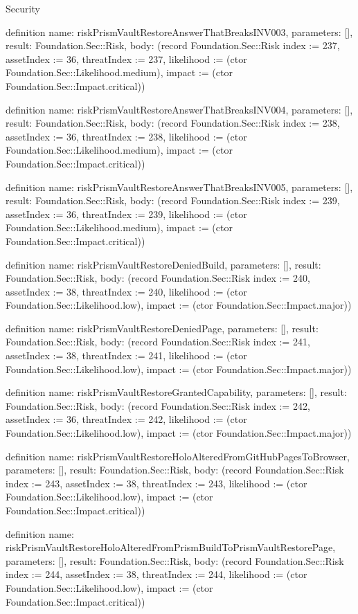 \begin{lexlean}{Security}
\begin{semanticmodule}
definition{
  name: riskPrismVaultRestoreAnswerThatBreaksINV003,
  parameters: [],
  result: Foundation.Sec::Risk,
  body: (record Foundation.Sec::Risk {index := 237, assetIndex := 36, threatIndex := 237, likelihood := (ctor Foundation.Sec::Likelihood.medium), impact := (ctor Foundation.Sec::Impact.critical)})
}

definition{
  name: riskPrismVaultRestoreAnswerThatBreaksINV004,
  parameters: [],
  result: Foundation.Sec::Risk,
  body: (record Foundation.Sec::Risk {index := 238, assetIndex := 36, threatIndex := 238, likelihood := (ctor Foundation.Sec::Likelihood.medium), impact := (ctor Foundation.Sec::Impact.critical)})
}

definition{
  name: riskPrismVaultRestoreAnswerThatBreaksINV005,
  parameters: [],
  result: Foundation.Sec::Risk,
  body: (record Foundation.Sec::Risk {index := 239, assetIndex := 36, threatIndex := 239, likelihood := (ctor Foundation.Sec::Likelihood.medium), impact := (ctor Foundation.Sec::Impact.critical)})
}

definition{
  name: riskPrismVaultRestoreDeniedBuild,
  parameters: [],
  result: Foundation.Sec::Risk,
  body: (record Foundation.Sec::Risk {index := 240, assetIndex := 38, threatIndex := 240, likelihood := (ctor Foundation.Sec::Likelihood.low), impact := (ctor Foundation.Sec::Impact.major)})
}

definition{
  name: riskPrismVaultRestoreDeniedPage,
  parameters: [],
  result: Foundation.Sec::Risk,
  body: (record Foundation.Sec::Risk {index := 241, assetIndex := 38, threatIndex := 241, likelihood := (ctor Foundation.Sec::Likelihood.low), impact := (ctor Foundation.Sec::Impact.major)})
}

definition{
  name: riskPrismVaultRestoreGrantedCapability,
  parameters: [],
  result: Foundation.Sec::Risk,
  body: (record Foundation.Sec::Risk {index := 242, assetIndex := 36, threatIndex := 242, likelihood := (ctor Foundation.Sec::Likelihood.low), impact := (ctor Foundation.Sec::Impact.major)})
}

definition{
  name: riskPrismVaultRestoreHoloAlteredFromGitHubPagesToBrowser,
  parameters: [],
  result: Foundation.Sec::Risk,
  body: (record Foundation.Sec::Risk {index := 243, assetIndex := 38, threatIndex := 243, likelihood := (ctor Foundation.Sec::Likelihood.low), impact := (ctor Foundation.Sec::Impact.critical)})
}

definition{
  name: riskPrismVaultRestoreHoloAlteredFromPrismBuildToPrismVaultRestorePage,
  parameters: [],
  result: Foundation.Sec::Risk,
  body: (record Foundation.Sec::Risk {index := 244, assetIndex := 38, threatIndex := 244, likelihood := (ctor Foundation.Sec::Likelihood.low), impact := (ctor Foundation.Sec::Impact.critical)})
}


\end{semanticmodule}
\end{lexlean}

